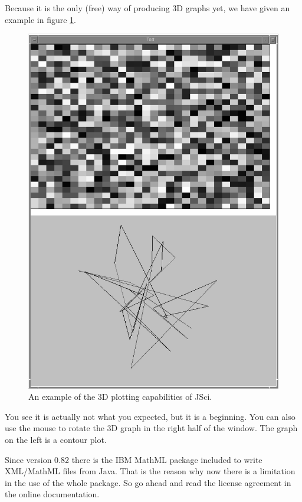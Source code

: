 Because it is the only (free) way of producing 3D graphs yet, we have 
given an example in figure \ref{fig:JSci3DGraph}. 
\begin{figure}[htbp]
  \begin{center}
    \includegraphics[angle=90,width=\textwidth]{Figures/JSciGraph3D.eps}
    \caption{An example of the 3D plotting capabilities of JSci.}
    \label{fig:JSci3DGraph}
  \end{center}
\end{figure}
You see it is actually not what you expected, but it is a beginning.
You can also use the mouse to rotate the 3D graph 
in the right half of the window. The graph on the left is a contour plot.

Since version 0.82 there is the IBM MathML package included to write 
XML/MathML files from Java. That is the reason why now there is a
limitation in the use of the whole package. So go ahead and read the license
agreement in the online documentation.

